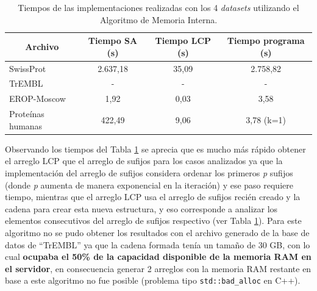 \begin{table}[h]
\centering
\begin{tabular}{|l|c|c|c|}
\hline
\multicolumn{1}{|c|}{\textbf{Archivo}}  & \textbf{Tiempo SA (s)} & \textbf{Tiempo LCP (s)} & \textbf{Tiempo programa (s)} \\ \hline
SwissProt         & 2.637,18                & 35,09                   & 2.758,82                         \\
TrEMBL            & -                & -                &        -                  \\
EROP-Moscow       & 1,92                   & 0,03                    & 3,58                         \\
Proteínas humanas & 422,49                 & 9,06                    & 3,78 (k=1)                         \\ \hline
\end{tabular}
\caption{Tiempos de las implementaciones realizadas con los 4 \textit{datasets} utilizando el Algoritmo de Memoria Interna.}
\label{tb:labelr3}
\end{table}

Observando los tiempos del Tabla \ref{tb:labelr3} se aprecia que es mucho más rápido obtener el arreglo LCP que el arreglo de sufijos para los casos analizados ya que la implementación del arreglo de sufijos considera ordenar los primeros \textit{p} sufijos (donde \textit{p} aumenta de manera exponencial en la iteración) y ese paso requiere tiempo, mientras que el arreglo LCP usa el arreglo de sufijos recién creado y la cadena para crear esta nueva estructura, y eso corresponde a analizar los elementos consecutivos del arreglo de sufijos respectivo (ver Tabla \ref{tb:labelr3}). Para este algoritmo no se pudo obtener los resultados con el archivo generado de la base de datos de ``TrEMBL'' ya que la cadena formada tenía un tamaño de 30 GB, con lo cual \textbf{ocupaba el 50\% de la capacidad disponible de la memoria RAM en el servidor}, en consecuencia generar 2 arreglos con la memoria RAM restante en base a este algoritmo no fue posible (problema tipo \texttt{std::bad\_alloc} en C++). 

